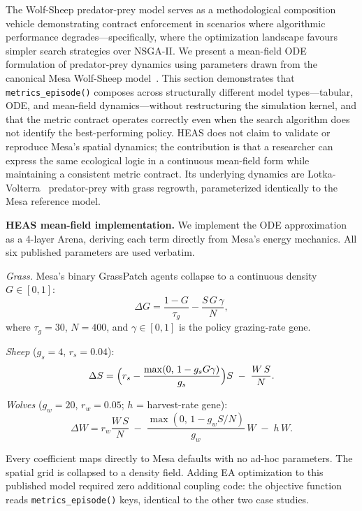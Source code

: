 \documentclass{wscpaperproc}
\begin{document}
The Wolf-Sheep predator-prey model serves as a methodological composition vehicle
demonstrating contract enforcement in scenarios where algorithmic performance
degrades---specifically, where the optimization landscape favours simpler search
strategies over NSGA-II.
We present a mean-field ODE formulation of predator-prey dynamics using
parameters drawn from the canonical Mesa Wolf-Sheep model~\cite{wilensky1997wolfsheep,kazil2020mesa}.
This section demonstrates that \texttt{metrics\_episode()} composes across
structurally different model types---tabular, ODE, and mean-field dynamics---without
restructuring the simulation kernel, and that the metric contract operates
correctly even when the search algorithm does not identify the best-performing
policy. HEAS does not claim to validate or reproduce Mesa's spatial dynamics;
the contribution is that a researcher can express the same ecological logic in a
continuous mean-field form while maintaining a consistent metric contract.
Its underlying dynamics are Lotka-Volterra~\cite{lotka1925elements,volterra1926variazioni} predator-prey with grass regrowth,
parameterized identically to the Mesa reference model.

\textbf{HEAS mean-field implementation.} We implement the ODE approximation as a
4-layer Arena, deriving each term directly from Mesa's energy mechanics.
All six published parameters are used verbatim.

\textit{Grass.} Mesa's binary GrassPatch agents collapse to a continuous
density $G\in[0,1]$:
\begin{equation}
  \Delta G = \frac{1-G}{\tau_g} - \frac{S\,G\,\gamma}{N},
  \label{eq:grass}
\end{equation}
where $\tau_g\!=\!30$, $N\!=\!400$, and $\gamma\!\in\![0,1]$ is the policy
grazing-rate gene.

\textit{Sheep} ($g_s\!=\!4$, $r_s\!=\!0.04$):
\begin{equation}
  \Delta S = \Bigl(r_s - \frac{\max(0,\,1-g_s G\gamma)}{g_s}\Bigr)S
             \;-\; \frac{W\,S}{N}.
  \label{eq:sheep}
\end{equation}

\textit{Wolves} ($g_w\!=\!20$, $r_w\!=\!0.05$; $h$ = harvest-rate gene):
\begin{equation}
  \Delta W = r_w \frac{W\,S}{N}
             \;-\; \frac{\max(0,\,1-g_w S/N)}{g_w}\,W
             \;-\; h\,W.
  \label{eq:wolf}
\end{equation}

Every coefficient maps directly to Mesa defaults with no ad-hoc parameters. The
spatial grid is collapsed to a density field. Adding EA optimization to this
published model required zero additional coupling code: the objective function
reads \texttt{metrics\_episode()} keys, identical to the other two case studies.
\end{document}
